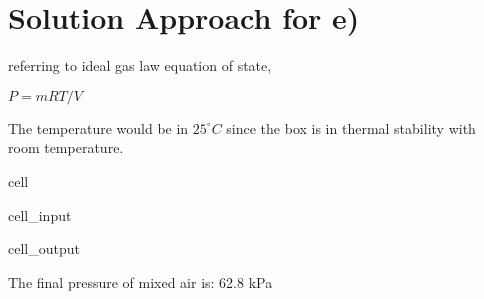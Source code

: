 \documentclass[letterpaper,10pt,english]{jupyterBook}
\begin{document}
\section{Solution Approach for e)}
\label{\detokenize{notebooks/Chapter3/CH3-Q2_v1:solution-approach-for-e}}
\sphinxAtStartPar
referring to ideal gas law equation of state,

\sphinxAtStartPar
\(P=mRT/V\)

\sphinxAtStartPar
The temperature would be in \(25 ^{\circ} C\) since the box is in thermal stability with room temperature.

\begin{sphinxuseclass}{cell}\begin{sphinxVerbatimInput}

\begin{sphinxuseclass}{cell_input}
\begin{sphinxVerbatim}[commandchars=\\\{\}]
     
       
   

         

  
\end{sphinxVerbatim}

\end{sphinxuseclass}\end{sphinxVerbatimInput}
\begin{sphinxVerbatimOutput}

\begin{sphinxuseclass}{cell_output}
\begin{sphinxVerbatim}[commandchars=\\\{\}]
The final pressure of mixed air is: 62.8 kPa
\end{sphinxVerbatim}

\end{sphinxuseclass}\end{sphinxVerbatimOutput}

\end{sphinxuseclass}
\sphinxstepscope
\end{document}

